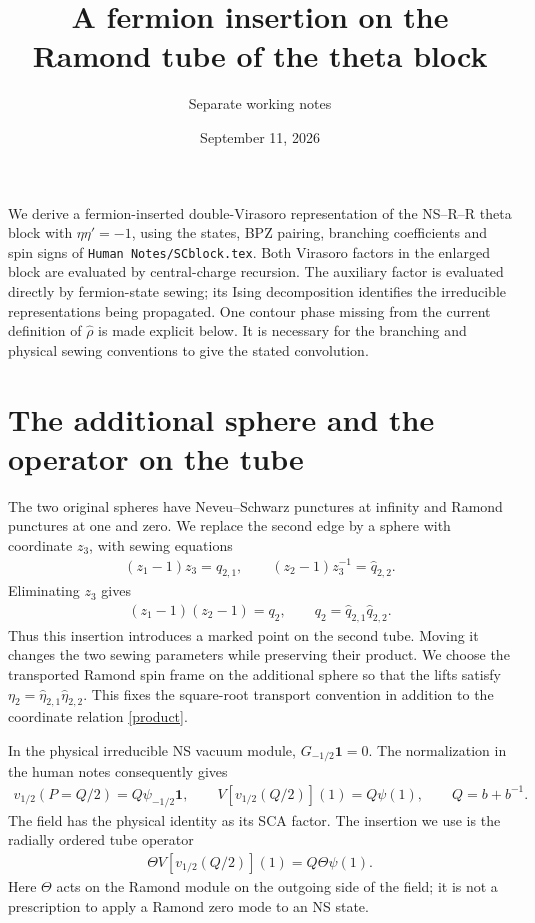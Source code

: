\documentclass[12pt]{article}
\title{A fermion insertion on the Ramond tube of the theta block}
\author{Separate working notes}
\date{September 11, 2026}
\newcommand{\ie}{\begin{equation}\begin{aligned}}
\newcommand{\fe}{\end{aligned}\end{equation}}
\numberwithin{equation}{section}
\begin{document}
\maketitle

We derive a fermion-inserted double-Virasoro representation of the
NS--R--R theta block with $\eta\eta'=-1$, using the states, BPZ pairing,
branching coefficients and spin signs of \texttt{Human Notes/SCblock.tex}.
Both Virasoro factors in the enlarged block are evaluated by
central-charge recursion.  The auxiliary factor is evaluated directly
by fermion-state sewing; its Ising decomposition identifies the
irreducible representations being propagated.
One contour phase missing from the current definition of $\hat\rho$ is
made explicit below.  It is necessary for the branching and physical
sewing conventions to give the stated convolution.

\section{The additional sphere and the operator on the tube}

The two original spheres have Neveu--Schwarz punctures at infinity and
Ramond punctures at one and zero.  We replace the second edge by a sphere
with coordinate $z_3$, with sewing equations
\ie
 (z_1-1)z_3=\hat q_{2,1},\qquad
 (z_2-1)z_3^{-1}=\hat q_{2,2}.
\fe
Eliminating $z_3$ gives
\ie
 (z_1-1)(z_2-1)=q_2,\qquad
 q_2=\hat q_{2,1}\hat q_{2,2}.
 \label{product}
\fe
Thus this insertion introduces a marked point on the second tube.  Moving
it changes the two sewing parameters while preserving their product.
We choose the transported Ramond spin frame on the additional sphere
so that the lifts satisfy $\eta_2=\hat\eta_{2,1}\hat\eta_{2,2}$.
This fixes the square-root transport convention in addition to the
coordinate relation \eqref{product}.

In the physical irreducible NS vacuum module,
$G_{-1/2}\mathbf1=0$.  The normalization in the human notes consequently
gives
\ie
 v_{1/2}(P=Q/2)=Q\psi_{-1/2}\mathbf1,
 \qquad V[v_{1/2}(Q/2)](1)=Q\psi(1),
 \qquad Q=b+b^{-1}.
\fe
The field has the physical identity as its SCA factor.  The insertion we
use is the radially ordered tube operator
\ie
 \Theta V[v_{1/2}(Q/2)](1)=Q\Theta\psi(1).
 \label{ordered-insertion}
\fe
Here $\Theta$ acts on the Ramond module on the outgoing side of the field;
it is not a prescription to apply a Ramond zero mode to an NS state.
\end{document}
